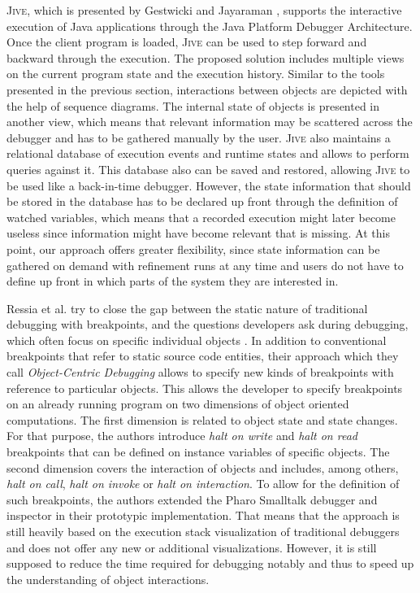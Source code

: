 \textsc{Jive}, which is presented by Gestwicki and Jayaraman \cite{gestwicki_jive:_2004, gestwicki_methodology_2005}, supports the interactive execution of Java applications through the Java Platform Debugger Architecture.
Once the client program is loaded, \textsc{Jive} can be used to step forward and backward through the execution.
The proposed solution includes multiple views on the current program state and the execution history.
Similar to the tools presented in the previous section, interactions between objects are depicted with the help of sequence diagrams.
The internal state of objects is presented in another view, which means that relevant information may be scattered across the debugger and has to be gathered manually by the user.
\textsc{Jive} also maintains a relational database of execution events and runtime states and allows to perform queries against it.
This database also can be saved and restored, allowing \textsc{Jive} to be used like a back-in-time debugger.
However, the state information that should be stored in the database has to be declared up front through the definition of watched variables, which means that a recorded execution might later become useless since information might have become relevant that is missing.
At this point, our approach offers greater flexibility, since state information can be gathered on demand with refinement runs at any time and users do not have to define up front in which parts of the system they are interested in.

Ressia et al. try to close the gap between the static nature of traditional  debugging with breakpoints, and the questions developers ask during debugging,  which often focus on specific individual objects \cite{ressia_object-centric_2012}.
In addition to conventional breakpoints that refer to static source code entities, their approach which they call \emph{Object-Centric Debugging} allows to specify new kinds of breakpoints with reference to particular objects.
 This allows the developer to specify breakpoints on an already running program on two dimensions of object oriented computations.
The first dimension is related to object state and state changes.
For that purpose, the authors introduce \emph{halt on write} and \emph{halt on read} breakpoints that can be defined on instance variables of specific objects.
The second dimension covers the interaction of objects and includes, among others, \emph{halt on call}, \emph{halt on invoke} or \emph{halt on interaction}.
To allow for the definition of such breakpoints, the authors extended the Pharo Smalltalk debugger and inspector in their prototypic implementation.
That means that the approach is still heavily based on the execution stack visualization of traditional debuggers and does not offer any new or additional visualizations.
However, it is still supposed to reduce the time required for debugging notably and thus to speed up the understanding of object interactions.

